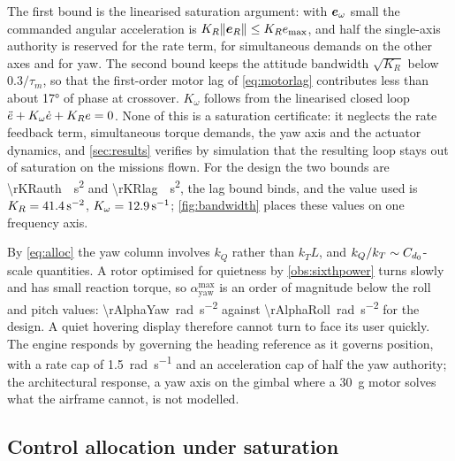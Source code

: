 The first bound is the linearised saturation argument: with $\bm{e}_\omega$
small the commanded angular acceleration is $K_R\|\bm{e}_R\|\le K_R e_{\max}$,
and half the single-axis authority is reserved for the rate term, for
simultaneous demands on the other axes and for yaw. The second bound keeps the
attitude bandwidth $\sqrt{K_R}$ below $0.3/\tau_m$, so that the first-order
motor lag of \cref{eq:motorlag} contributes less than about \ang{17} of phase
at crossover. $K_\omega$ follows from the linearised closed loop
$\ddot{e} + K_\omega\dot{e} + K_R e = 0$. None of this is a saturation certificate:
it neglects the rate feedback term, simultaneous torque demands, the yaw axis
and the actuator dynamics, and \cref{sec:results} verifies by simulation that
the resulting loop stays out of saturation on the missions flown. For the
design the two bounds are \SI{\rKRauth}{\per\second\squared} and
\SI{\rKRlag}{\per\second\squared}, the lag bound binds, and the value used is
$K_R=\SI{41.4}{\per\second\squared}$, $K_\omega=\SI{12.9}{\per\second}$;
\cref{fig:bandwidth} places these values on one frequency axis.

\begin{remark}
By \cref{eq:alloc} the yaw column involves $k_Q$ rather than $k_T L$, and
$k_Q/k_T \sim C_{d_0}$-scale quantities. A rotor optimised for quietness by
\cref{obs:sixthpower} turns slowly and has small reaction torque, so
$\alpha_{\mathrm{yaw}}^{\max}$ is an order of magnitude below the roll and
pitch values: \SI{\rAlphaYaw}{\radian\per\second\squared} against
\SI{\rAlphaRoll}{\radian\per\second\squared} for the design. A quiet hovering
display therefore cannot turn to face its user quickly. The engine responds by
governing the heading reference as it governs position, with a rate cap of
\SI{1.5}{\radian\per\second} and an acceleration cap of half the yaw
authority; the architectural response, a yaw axis on the gimbal where a
\SI{30}{\gram} motor solves what the airframe cannot, is not modelled.
\end{remark}

\FloatBarrier
\subsection{Control allocation under saturation}

